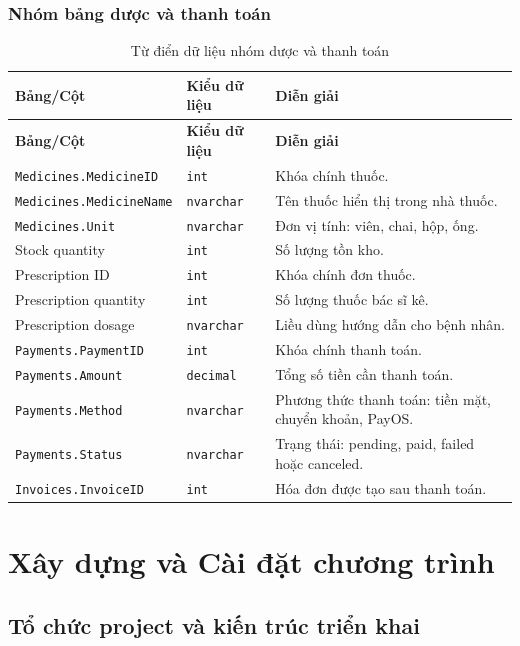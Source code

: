 \documentclass[12pt,a4paper]{article}
\numberwithin{figure}{subsection}
\numberwithin{table}{subsection}
\begin{document}
\subsubsection{Nhóm bảng dược và thanh toán}

\begin{longtable}{|p{4.4cm}|p{2.4cm}|p{6.8cm}|}
\caption{Từ điển dữ liệu nhóm dược và thanh toán} \\
\hline
\textbf{Bảng/Cột} & \textbf{Kiểu dữ liệu} & \textbf{Diễn giải} \\
\hline
\endfirsthead
\hline
\textbf{Bảng/Cột} & \textbf{Kiểu dữ liệu} & \textbf{Diễn giải} \\
\hline
\endhead
\texttt{Medicines.MedicineID} & \texttt{int} & Khóa chính thuốc. \\
\hline
\texttt{Medicines.MedicineName} & \texttt{nvarchar} & Tên thuốc hiển thị trong nhà thuốc. \\
\hline
\texttt{Medicines.Unit} & \texttt{nvarchar} & Đơn vị tính: viên, chai, hộp, ống. \\
\hline
Stock quantity & \texttt{int} & Số lượng tồn kho. \\
\hline
Prescription ID & \texttt{int} & Khóa chính đơn thuốc. \\
\hline
Prescription quantity & \texttt{int} & Số lượng thuốc bác sĩ kê. \\
\hline
Prescription dosage & \texttt{nvarchar} & Liều dùng hướng dẫn cho bệnh nhân. \\
\hline
\texttt{Payments.PaymentID} & \texttt{int} & Khóa chính thanh toán. \\
\hline
\texttt{Payments.Amount} & \texttt{decimal} & Tổng số tiền cần thanh toán. \\
\hline
\texttt{Payments.Method} & \texttt{nvarchar} & Phương thức thanh toán: tiền mặt, chuyển khoản, PayOS. \\
\hline
\texttt{Payments.Status} & \texttt{nvarchar} & Trạng thái: pending, paid, failed hoặc canceled. \\
\hline
\texttt{Invoices.InvoiceID} & \texttt{int} & Hóa đơn được tạo sau thanh toán. \\
\hline
\end{longtable}

\section{Xây dựng và Cài đặt chương trình}

\subsection{Tổ chức project và kiến trúc triển khai}
\end{document}
